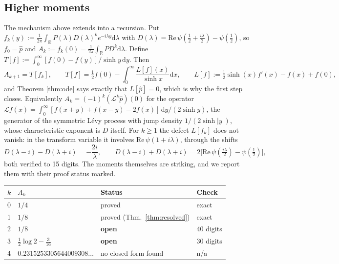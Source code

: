 \documentclass[12pt,a4paper]{article}
\theoremstyle{plain}
\theoremstyle{definition}
\theoremstyle{remark}
\newcommand{\R}{\mathbb{R}}
\newcommand{\dd}{\mathrm{d}}
\begin{document}
\subsection{Higher moments}

The mechanism above extends into a recursion. Put
$f_k(y):=\tfrac{1}{2\pi}\int_\R P(\lambda)D(\lambda)^k e^{-i\lambda y}\dd\lambda$
with $D(\lambda)=\mathrm{Re}\,\psi(\tfrac12+\tfrac{i\lambda}{2})-\psi(\tfrac12)$,
so $f_0=\hat p$ and $A_k:=f_k(0)=\tfrac{1}{2\pi}\int_\R P D^k\dd\lambda$.
Define $T[f]:=\int_0^\infty[f(0)-f(y)]/\sinh y\,\dd y$. Then
\begin{equation}
A_{k+1}=T[f_k],
\qquad
T[f]=\tfrac12 f(0)-\int_0^\infty\frac{L[f](x)}{\sinh x}\dd x,
\qquad
L[f]:=\tfrac12\sinh(x)f'(x)-f(x)+f(0),
\label{eq:recursion}
\end{equation}
and Theorem \ref{thm:ode} says exactly that $L[\hat p]=0$, which is why
the first step closes. Equivalently $A_k=(-1)^k(\mathcal L^k\hat p)(0)$
for the operator
$\mathcal L f(x)=\int_0^\infty[f(x+y)+f(x-y)-2f(x)]\,\dd y/(2\sinh y)$,
the generator of the symmetric L\'evy process with jump density
$1/(2\sinh|y|)$, whose characteristic exponent is $D$ itself.
For $k\ge1$ the defect $L[f_k]$ does not vanish:
in the transform variable it involves $\mathrm{Re}\,\psi(1+i\lambda)$,
through the shifts
\begin{equation}
D(\lambda-i)-D(\lambda+i)=-\frac{2i}{\lambda},
\qquad
D(\lambda-i)+D(\lambda+i)=2\bigl[\mathrm{Re}\,\psi(\tfrac{i\lambda}{2})-\psi(\tfrac12)\bigr],
\label{eq:Dshift}
\end{equation}
both verified to 15 digits. The moments themselves are striking, and we
report them with their proof status marked.

\begin{center}
\begin{tabular}{llll}
\toprule
$k$ & $A_k$ & Status & Check \\
\midrule
0 & $1/4$ & proved & exact \\
1 & $1/8$ & proved (Thm.~\ref{thm:resolved}) & exact \\
2 & $1/8$ & \textbf{open} & 40 digits \\
3 & $\tfrac12\log 2-\tfrac{3}{16}$ & \textbf{open} & 30 digits \\
4 & $0.2315253305644009308\ldots$ & no closed form found & n/a \\
\bottomrule
\end{tabular}
\end{center}
\end{document}
